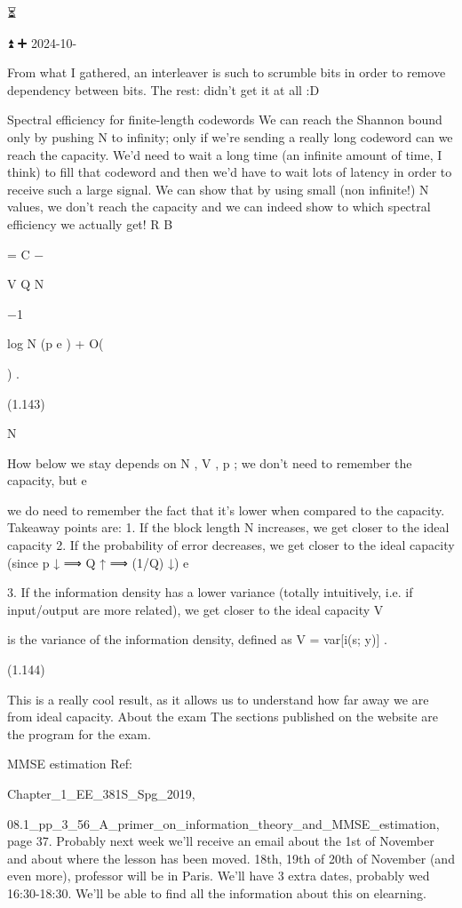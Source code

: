 {⏳

⏫ ➕ 2024-10-

From what I gathered, an interleaver is such to scrumble bits in order to remove dependency between bits.
The rest: didn't get it at all :D

Spectral efficiency for finite-length codewords We can reach the Shannon bound only by pushing N to infinity; only if we're sending a really long codeword can we reach the capacity. We'd need to wait a long time (an infinite amount of time, I think) to fill that codeword and then we'd have to wait lots of latency in order to receive such a large signal.
We can show that by using small (non infinite!) N values, we don't reach the capacity and we can indeed show to which spectral efficiency we actually get!
R B

= C − \sqrt

V Q N

−1

log N
(p e ) + O(

) .

(1.143)

N

How below we stay depends on N , V , p ; we don't need to remember the capacity, but e

we do need to remember the fact that it's lower when compared to the capacity.
Takeaway points are:
1. If the block length N increases, we get closer to the ideal capacity 2. If the probability of error decreases, we get closer to the ideal capacity (since p ↓ ⟹ Q ↑ ⟹ (1/Q) ↓)
e

3. If the information density has a lower variance (totally intuitively, i.e. if input/output are more related), we get closer to the ideal capacity V

is the variance of the information density, defined as V = var[i(s; y)] .

(1.144)

This is a really cool result, as it allows us to understand how far away we are from ideal capacity.
About the exam The sections published on the website are the program for the exam.

MMSE estimation Ref:

Chapter_1_EE_381S_Spg_2019,

08.1_pp_3_56_A_primer_on_information_theory_and_MMSE_estimation, page 37.
Probably next week we'll receive an email about the 1st of November and about where the lesson has been moved.
18th, 19th of 20th of November (and even more), professor will be in Paris. We'll have 3 extra dates, probably wed 16:30-18:30. We'll be able to find all the information about this on elearning.

}
